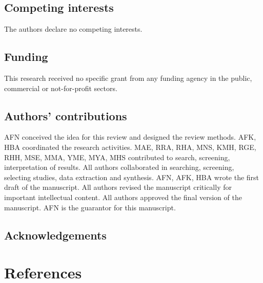 \documentclass[
  letterpaper,
  DIV=11,
  numbers=noendperiod]{scrartcl}
\begin{document}
\subsection{Competing interests}\label{competing-interests}

The authors declare no competing interests.

\subsection{Funding}\label{funding}

This research received no specific grant from any funding agency in the
public, commercial or not-for-profit sectors.

\subsection{Authors' contributions}\label{authors-contributions}

AFN conceived the idea for this review and designed the review methods.
AFK, HBA coordinated the research activities. MAE, RRA, RHA, MNS, KMH,
RGE, RHH, MSE, MMA, YME, MYA, MHS contributed to search, screening,
interpretation of results. All authors collaborated in searching,
screening, selecting studies, data extraction and synthesis. AFN, AFK,
HBA wrote the first draft of the manuscript. All authors revised the
manuscript critically for important intellectual content. All authors
approved the final version of the manuscript. AFN is the guarantor for
this manuscript.

\subsection{Acknowledgements}\label{acknowledgements}

\section{References}\label{references}
\end{document}
